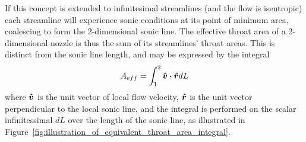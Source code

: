 \documentclass[a4paper, 11pt, twoside]{report}
\begin{document}
If this concept is extended to infinitesimal streamlines (and the flow is isentropic) each streamline will experience sonic conditions at its point of minimum area, coalescing to form the 2-dimensional sonic line. The effective throat area of a 2-dimensional nozzle is thus the sum of its streamlines' throat areas. This is distinct from the sonic line length, and may be expressed by the integral
\begin{equation}\label{effective_throat_area_integral}
	A_{eff} = 
	\int_{1}^2 \vu*{v} \vdot \vu*{r} dL
\end{equation}
where $\vu*{v}$ is the unit vector of local flow velocity, $\vu*{r}$ is the unit vector perpendicular to the local sonic line, and the integral is performed on the scalar infinitessimal $dL$ over the length of the sonic line, as illustrated in Figure~\ref{fig:illustration_of_equivalent_throat_area_integral}.
 		
\end{document}
